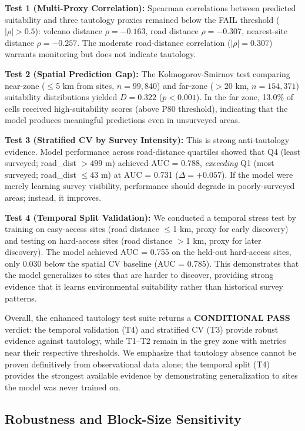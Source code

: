 \documentclass{article}
\begin{document}
\textbf{Test 1 (Multi-Proxy Correlation):} Spearman correlations between predicted suitability and three tautology proxies remained below the FAIL threshold ($|\rho| > 0.5$): volcano distance $\rho = -0.163$, road distance $\rho = -0.307$, nearest-site distance $\rho = -0.257$. The moderate road-distance correlation ($|\rho| = 0.307$) warrants monitoring but does not indicate tautology.

\textbf{Test 2 (Spatial Prediction Gap):} The Kolmogorov-Smirnov test comparing near-zone ($\leq$5 km from sites, $n = 99{,}840$) and far-zone ($>$20 km, $n = 154{,}371$) suitability distributions yielded $D = 0.322$ ($p < 0.001$). In the far zone, 13.0\% of cells received high-suitability scores (above P80 threshold), indicating that the model produces meaningful predictions even in unsurveyed areas.

\textbf{Test 3 (Stratified CV by Survey Intensity):} This is strong anti-tautology evidence. Model performance across road-distance quartiles showed that Q4 (least surveyed; road\_dist $> 499$ m) achieved AUC = 0.788, \textit{exceeding} Q1 (most surveyed; road\_dist $\leq 43$ m) at AUC = 0.731 ($\Delta = +0.057$). If the model were merely learning survey visibility, performance should degrade in poorly-surveyed areas; instead, it improves.

\textbf{Test 4 (Temporal Split Validation):} We conducted a temporal stress test by training on easy-access sites (road distance $\leq$1 km, proxy for early discovery) and testing on hard-access sites (road distance $>$1 km, proxy for later discovery). The model achieved AUC = 0.755 on the held-out hard-access sites, only 0.030 below the spatial CV baseline (AUC = 0.785). This demonstrates that the model generalizes to sites that are harder to discover, providing strong evidence that it learns environmental suitability rather than historical survey patterns.

Overall, the enhanced tautology test suite returns a \textbf{CONDITIONAL PASS} verdict: the temporal validation (T4) and stratified CV (T3) provide robust evidence against tautology, while T1--T2 remain in the grey zone with metrics near their respective thresholds. We emphasize that tautology absence cannot be proven definitively from observational data alone; the temporal split (T4) provides the strongest available evidence by demonstrating generalization to sites the model was never trained on.

\subsection{Robustness and Block-Size Sensitivity}
\end{document}
